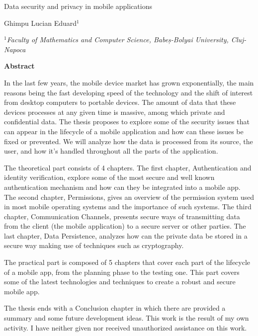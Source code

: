 \documentclass[a4paper, 12pt]{article}
\begin{document}

\Large
 \begin{center}
Data security and privacy in mobile applications\\ 

\hspace{10pt}

\large
Ghimpu Lucian Eduard$^1$ \\
\hspace{10pt}

\small
 \textit{$^1$Faculty of Mathematics and Computer Science, Babeș-Bolyai University, Cluj-Napoca}\\



\end{center}

\hspace{10pt}

\begin{center}
    \small
    \textbf{Abstract} \\
\end{center}


\normalsize

In the last few years, the mobile device market has grown exponentially, the main reasons being the fast developing speed of the technology and the shift of interest from desktop computers to portable devices. The amount of data that these devices processes at any given time is massive, among which private and confidential data.
The thesis proposes to explore some of the security issues that can appear in the lifecycle of a mobile application and how can these issues be fixed or prevented. We will analyze how the data is processed from its source, the user, and how it's handled throughout all the parts of the application.

The theoretical part consists of 4 chapters. The first chapter, Authentication and identity verification, explore some of the most secure and well known authentication mechanism and how can they be integrated into a mobile app. The second chapter, Permissions, gives an overview of the permission system used in most mobile operating systems and the importance of such systems. The third chapter, Communication Channels, presents secure ways of transmitting data from the client (the mobile application) to a secure server or other parties. The last chapter, Data Persistence, analyzes how can the private data be stored in a secure way making use of techniques such as cryptography.

The practical part is composed of 5 chapters that cover each part of the lifecycle of a mobile app, from the planning phase to the testing one. This part covers some of the latest technologies and techniques to create a robust and secure mobile app.

The thesis ends with a Conclusion chapter in which there are provided a summary and some future development ideas.
This work is the result of my own activity. I have neither given nor received unauthorized assistance on this work.
\end{document}
